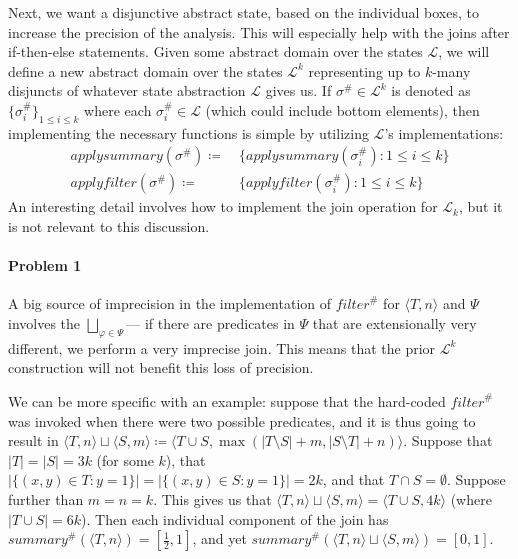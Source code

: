 Next, we want a disjunctive abstract state, based on the individual boxes,
to increase the precision of the analysis.
This will especially help with the joins after if-then-else statements.
Given some abstract domain over the states $\mathcal{L}$,
we will define a new abstract domain over the states $\mathcal{L}^k$
representing up to $k$-many disjuncts of whatever state abstraction $\mathcal{L}$ gives us.
If $\sigma^\# \in \mathcal{L}^k$ is denoted as $\{\sigma^\#_i\}_{1 \leq i \leq k}$
where each $\sigma^\#_i \in \mathcal{L}$
(which could include bottom elements),
then implementing the necessary functions is simple
by utilizing $\mathcal{L}$'s implementations:
\begin{align*}
    \mathit{applysummary}(\sigma^\#) \coloneqq&~
    \{\mathit{applysummary}(\sigma^\#_i) : 1 \leq i \leq k\} \\
    \mathit{applyfilter}(\sigma^\#) \coloneqq&~
    \{\mathit{applyfilter}(\sigma^\#_i) : 1 \leq i \leq k\}
\end{align*}
An interesting detail involves how to implement the join operation for $\mathcal{L}_k$,
but it is not relevant to this discussion.

\paragraph{Problem 1}
A big source of imprecision in the implementation of
$\mathit{filter}^\#$ for $\langle T, n \rangle$ and $\Psi$
involves the $\bigsqcup_{\varphi \in \Psi}$---%
if there are predicates in $\Psi$ that are extensionally very different,
we perform a very imprecise join.
This means that the prior $\mathcal{L}^k$ construction
will not benefit this loss of precision.

We can be more specific with an example:
suppose that the hard-coded $\mathit{filter}^\#$
was invoked when there were two possible predicates, and it is thus going to result in
$\langle T, n \rangle \sqcup \langle S, m \rangle
\coloneqq \langle T \cup S, \max(|T \setminus S| + m, |S \setminus T| + n) \rangle$.
Suppose that $|T| = |S| = 3k$ (for some $k$),
that $|\{(x,y) \in T : y = 1\}| = |\{(x,y) \in S : y = 1\}| = 2k$,
and that $T \cap S = \emptyset$.
Suppose further than $m = n = k$.
This gives us that $\langle T, n \rangle \sqcup \langle S, m \rangle
= \langle T \cup S, 4k \rangle$ (where $|T \cup S| = 6k$).
Then each individual component of the join has
$\mathit{summary}^\#(\langle T, n \rangle) = [\frac{1}{2}, 1]$,
and yet
$\mathit{summary}^\#(\langle T, n \rangle \sqcup \langle S, m \rangle)
= [0, 1]$.

